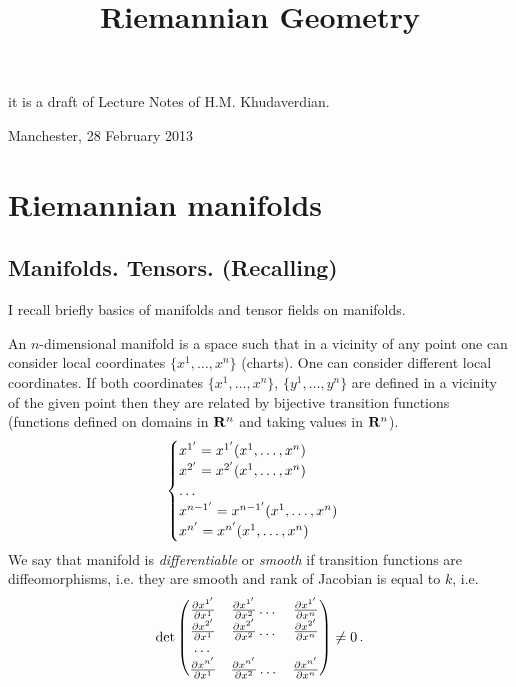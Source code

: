 \documentclass[12pt]{article}
\title{Riemannian Geometry}
\date{}
\theoremstyle{theorem}
\numberwithin{equation}{section}
\begin{document}
\maketitle

  \centerline {it is a draft of Lecture Notes of H.M. Khudaverdian.}

  \centerline { Manchester, 28 February  2013}





\tableofcontents


\section {Riemannian manifolds}


\subsection { Manifolds. Tensors. (Recalling)}


I recall briefly basics of manifolds and tensor fields on manifolds.

An $n$-dimensional manifold is a space such that in a vicinity of any point
one can consider local coordinates $\{x^1,\dots,x^n\}$ (charts). One can consider different local coordinates.
If both coordinates $\{x^1,\dots,x^n\}$, $\{y^1,\dots,y^n\}$ are defined in a vicinity of the given point
then they are related by  bijective transition functions (functions defined on domains in $\R^n$ and taking values in $\R^n$).
              $$
             \begin{cases}
             x^{1'}=x^{1'}(x^1,\dots,x^n)\cr
             x^{2'}=x^{2'}(x^1,\dots,x^n)\cr
                \dots\cr
            x^{{n-1}'}=x^{{n-1}'}(x^1,\dots,x^n)\cr
              x^{{n}'}=x^{{n}'}(x^1,\dots,x^n)\cr

             \end{cases}
              $$
 We say that manifold is {\it differentiable} or {\it smooth} if transition functions are diffeomorphisms,
i.e. they are smooth and rank of Jacobian is equal to $k$, i.e.
              \begin{equation}\label{transfunctions---diffeomorphisms}
      \det
          \begin{pmatrix}
          {\p x^{1'}\over \p x^1} &{\p x^{1'}\over \p x^2}\dots &{\p x^{1'}\over \p x^n}\cr
         {\p x^{2'}\over \p x^1} &{\p x^{2'}\over \p x^2} \dots &{\p x^{2'}\over \p x^n}\cr
                           \dots\cr
      {\p x^{n'}\over \p x^1} &{\p x^{n'}\over \p x^2}\dots &{\p x^{n'}\over \p x^n}\cr
          \end{pmatrix}\not=0\,.
              \end{equation}
\end{document}
